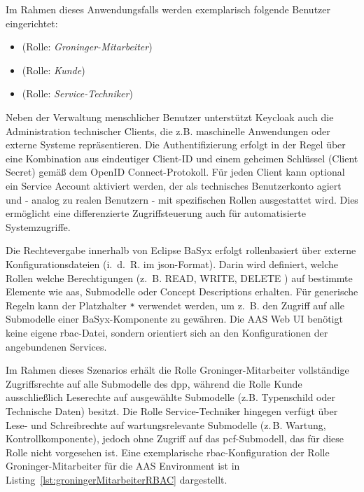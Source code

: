 Im Rahmen dieses Anwendungsfalls werden exemplarisch folgende Benutzer eingerichtet:

\begin{itemize}[noitemsep, leftmargin=*, label=\textbullet]
  \item {} (Rolle: \textit{Groninger-Mitarbeiter})
  \item {} (Rolle: \textit{Kunde})
  \item {} (Rolle: \textit{Service-Techniker})
\end{itemize}

Neben der Verwaltung menschlicher Benutzer unterstützt Keycloak auch die Administration technischer Clients, die z.B. maschinelle Anwendungen oder externe Systeme repräsentieren.  
Die Authentifizierung erfolgt in der Regel über eine Kombination aus eindeutiger Client-ID und einem geheimen Schlüssel (Client Secret) gemäß dem OpenID Connect-Protokoll.  
Für jeden Client kann optional ein Service Account aktiviert werden, der als technisches Benutzerkonto agiert und - analog zu realen Benutzern - mit spezifischen Rollen ausgestattet wird.  
Dies ermöglicht eine differenzierte Zugriffsteuerung auch für automatisierte Systemzugriffe.

Die Rechtevergabe innerhalb von Eclipse BaSyx erfolgt rollenbasiert über externe Konfigurationsdateien (i.~d.~R. im \acs{json}-Format).  
Darin wird definiert, welche Rollen welche Berechtigungen (z.~B. READ, WRITE, DELETE ) auf bestimmte Elemente wie \acs{aas}, Submodelle oder Concept Descriptions erhalten.  
Für generische Regeln kann der Platzhalter \texttt{*} verwendet werden, um z.~B. den Zugriff auf alle Submodelle einer BaSyx-Komponente zu gewähren.  
Die AAS Web UI benötigt keine eigene \acs{rbac}-Datei, sondern orientiert sich an den Konfigurationen der angebundenen Services.

Im Rahmen dieses Szenarios erhält die Rolle Groninger-Mitarbeiter vollständige Zugriffsrechte auf alle Submodelle des \acs{dpp}, während die Rolle Kunde ausschließlich Leserechte auf ausgewählte Submodelle (z.B. Typenschild oder Technische Daten) besitzt.  
Die Rolle Service-Techniker hingegen verfügt über Lese- und Schreibrechte auf wartungsrelevante Submodelle (z.\,B. Wartung, Kontrollkomponente), jedoch ohne Zugriff auf das \acs{pcf}-Submodell, das für diese Rolle nicht vorgesehen ist.  
Eine exemplarische \acs{rbac}-Konfiguration der Rolle Groninger-Mitarbeiter für die AAS Environment ist in Listing~\ref{lst:groningerMitarbeiterRBAC} dargestellt.

